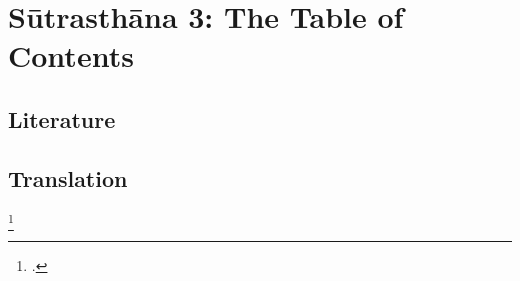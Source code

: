 
\chapter{Sūtrasthāna 3: The Table of Contents}


\section{Literature}

\section{Translation}

\begin{translation}    
    \item [1] 
    
    \item [54]
    \footnote{\cite[167]{bron-how}.}
    
\end{translation}



